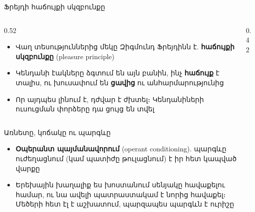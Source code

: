 \begin{frame}{Ֆրեյդի հաճույքի սկզբունքը}
  \begin{columns}[c]
    \begin{column}{0.52\textwidth}
      \begin{itemize}
        \item Վաղ տեսություններից մեկը Զիգմունդ Ֆրեյդինն է. \textbf{հաճույքի սկզբունքը} (pleasure principle)
        \item Կենդանի էակները ձգտում են այն բանին, ինչ \textbf{հաճույք} է տալիս, ու խուսափում են \textbf{ցավից} ու անհարմարությունից
        \item<2-> Որ այդպես լինում է, դժվար է ժխտել։ Կենդանիների ուսուցման փորձերը դա ցույց են տվել
      \end{itemize}
    \end{column}
    \begin{column}{0.42\textwidth}
    \end{column}
  \end{columns}
\end{frame}

\begin{frame}{Առնետը, կոճակը ու պարգևը}
  \centering
  \par\medskip
  \raggedright
  \begin{itemize}
    \item<4-> \textbf{Օպերանտ պայմանավորում} (operant conditioning). պարգևը ուժեղացնում (կամ պատիժը թուլացնում) է իր հետ կապված վարքը
    \item<5-> Երեխային խաղալիք ես խոստանում սենյակը հավաքելու համար, ու նա ավելի պատրաստակամ է նորից հավաքել։ Մեծերի հետ էլ է աշխատում, պարզապես պարգևն է ուրիշը
  \end{itemize}
\end{frame}

